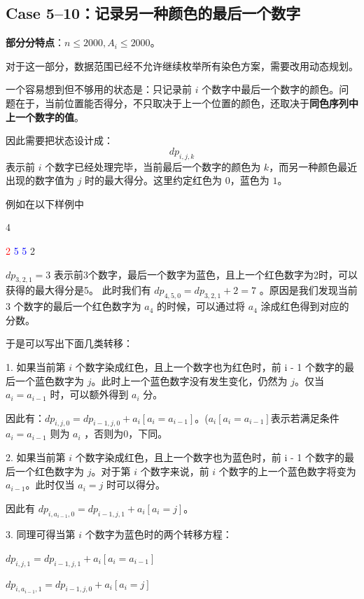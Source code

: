 \documentclass{book}
\begin{document}
    \subsection{Case 5--10：记录另一种颜色的最后一个数字}

    \textbf{部分分特点}：$n\leq 2000, A_i\leq 2000$。

    对于这一部分，数据范围已经不允许继续枚举所有染色方案，需要改用动态规划。

    一个容易想到但不够用的状态是：只记录前 $i$ 个数字中最后一个数字的颜色。问题在于，当前位置能否得分，不只取决于上一个位置的颜色，还取决于\textbf{同色序列中上一个数字的值}。

    因此需要把状态设计成：
    \[
    dp_{i,j,k}
    \]
    表示前 $i$ 个数字已经处理完毕，当前最后一个数字的颜色为 $k$，而另一种颜色最近出现的数字值为 $j$ 时的最大得分。这里约定红色为 $0$，蓝色为 $1$。

    例如在以下样例中
    
    4
    
    \textcolor{red}{2} \textcolor{blue}{5} \textcolor{blue}{5}  2 

    $dp_{3,2,1} = 3$ 表示前3个数字，最后一个数字为蓝色，且上一个红色数字为2时，可以获得的最大得分是5。
    此时我们有 $dp_{4,5,0} = dp_{3,2,1} + 2 = 7$ 。原因是我们发现当前 $3$ 个数字的最后一个红色数字为 $a_4$ 的时候，可以通过将 $a_4$ 涂成红色得到对应的分数。

    于是可以写出下面几类转移：

    1. 如果当前第 $i$ 个数字染成红色，且上一个数字也为红色时，前 i - 1 个数字的最后一个蓝色数字为 $j$。此时上一个蓝色数字没有发生变化，仍然为 $j$。仅当 $a_i = a_{i - 1}$ 时，可以额外得到 $a_i$ 分。

    因此有：$dp_{i, j, 0} = dp_{i - 1, j, 0} + a_i[a_i = a_{i - 1}]$。($a_i[a_i=a_{i-1}]$表示若满足条件 $a_i = a_{i - 1}$ 则为 $a_i$ ，否则为0，下同。

    2. 如果当前第 $i$ 个数字染成红色，且上一个数字也为蓝色时，前 i - 1 个数字的最后一个红色数字为 $j$。对于第 $i$ 个数字来说，前 $i$ 个数字的上一个蓝色数字将变为 $a_{i - 1}$。此时仅当 $a_i = j$ 时可以得分。

    因此有 $dp_{i, a_{i - 1}, 0} = dp_{i - 1, j, 1} + a_i[a_i =j]$。

    3. 同理可得当第 $i$ 个数字为蓝色时的两个转移方程：

    $dp_{i,j,1} = dp_{i-1,j,1} + a_i[a_i = a_{i-1}]$

    $dp_{i,a_{i-1},1} = dp_{i-1,j,0} + a_i[a_i=j]$
\end{document}
